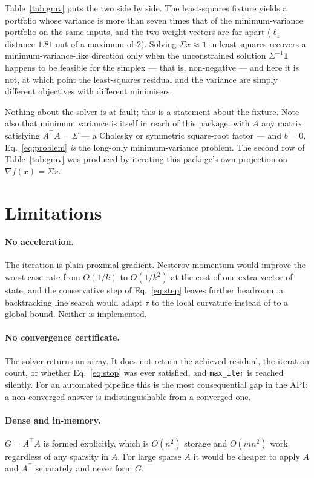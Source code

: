 \documentclass[11pt,a4paper]{article}
\newcommand{\code}[1]{\texttt{#1}}
\begin{document}
Table~\ref{tab:gmv} puts the two side by side. The least-squares fixture yields a
portfolio whose variance is more than seven times that of the minimum-variance
portfolio on the same inputs, and the two weight vectors are far apart
($\ell_1$ distance $1.81$ out of a maximum of $2$). Solving $\Sigma x \approx
\mathbf{1}$ in least squares recovers a minimum-variance-like direction only
when the unconstrained solution $\Sigma^{-1}\mathbf{1}$ happens to be feasible
for the simplex --- that is, non-negative --- and here it is not, at which point
the least-squares residual and the variance are simply different objectives with
different minimisers.

Nothing about the solver is at fault; this is a statement about the fixture. Note
also that minimum variance is itself in reach of this package: with $A$ any
matrix satisfying $A^{\top}A = \Sigma$ --- a Cholesky or symmetric square-root
factor --- and $b = 0$, Eq.~\eqref{eq:problem} \emph{is} the long-only
minimum-variance problem. The second row of Table~\ref{tab:gmv} was produced by
iterating this package's own projection on $\nabla f(x) = \Sigma x$.

\section{Limitations}

\paragraph{No acceleration.} The iteration is plain proximal gradient. Nesterov
momentum \citep{beck2009} would improve the worst-case rate from $O(1/k)$ to
$O(1/k^2)$ at the cost of one extra vector of state, and the conservative step
of Eq.~\eqref{eq:step} leaves further headroom: a backtracking line search would
adapt $\tau$ to the local curvature instead of to a global bound. Neither is
implemented.

\paragraph{No convergence certificate.} The solver returns an array. It does not
return the achieved residual, the iteration count, or whether
Eq.~\eqref{eq:stop} was ever satisfied, and \code{max\_iter} is reached
silently. For an automated pipeline this is the most consequential gap in the
API: a non-converged answer is indistinguishable from a converged one.

\paragraph{Dense and in-memory.} $G = A^{\top}A$ is formed explicitly, which is
$O(n^2)$ storage and $O(mn^2)$ work regardless of any sparsity in $A$. For large
sparse $A$ it would be cheaper to apply $A$ and $A^{\top}$ separately and never
form $G$.
\end{document}
